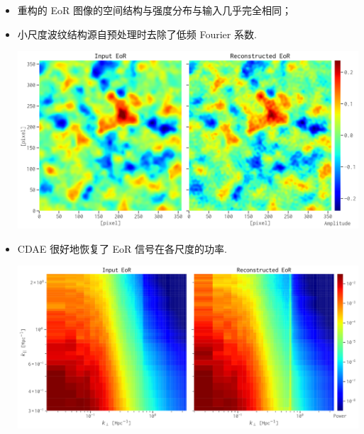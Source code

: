 \documentclass{beamer}
\begin{document}
\begin{frame}
  \vspace{1ex}
  \begin{itemize}
    \item 重构的 EoR 图像的空间结构与强度分布与输入几乎完全相同；
    \item 小尺度波纹结构源自预处理时去除了低频 Fourier 系数.
      \par\includegraphics[height=0.45\textheight]{cdae-eor-img-comp}
    \item CDAE 很好地恢复了 EoR 信号在各尺度的功率.
      \par\includegraphics[height=0.45\textheight]{cdae-eor-ps-comp}
  \end{itemize}
\end{frame}
\end{document}

